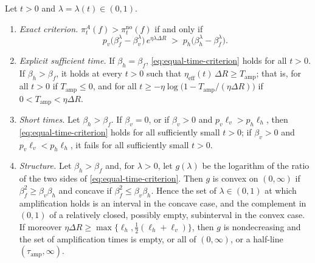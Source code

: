 \begin{proposition}
\label{prop:equal-time}
Let $t>0$ and $\lambda=\lambda(t)\in(0,1)$.
\begin{enumerate}
\item[\textup{(i)}] \emph{Exact criterion.}
$\pi^{A}_t(f)>\pi^{\mathrm{no}}_t(f)$ if and only if
\begin{equation}\label{eq:equal-time-criterion}
p_v\bigl(\beta_f^{\lambda}-\beta_v^{\lambda}\bigr)\,e^{\eta\lambda\Delta R}
\;>\;p_h\bigl(\beta_h^{\lambda}-\beta_f^{\lambda}\bigr).
\end{equation}
\item[\textup{(ii)}] \emph{Explicit sufficient time.} If $\beta_h=\beta_f$,
\eqref{eq:equal-time-criterion} holds for all $t>0$. If $\beta_h>\beta_f$,
it holds at every $t>0$ such that
$\eta_{\mathrm{eff}}(t)\,\Delta R\ge T_{\mathrm{amp}}$; that is, for all
$t>0$ if $T_{\mathrm{amp}}\le0$, and for all
$t\ge-\eta\log\bigl(1-T_{\mathrm{amp}}/(\eta\Delta R)\bigr)$ if
$0<T_{\mathrm{amp}}<\eta\Delta R$.
\item[\textup{(iii)}] \emph{Short times.} Let $\beta_h>\beta_f$. If
$\beta_v=0$, or if $\beta_v>0$ and $p_v\ell_v>p_h\ell_h$, then
\eqref{eq:equal-time-criterion} holds for all sufficiently small $t>0$; if
$\beta_v>0$ and $p_v\ell_v<p_h\ell_h$, it fails for all sufficiently small
$t>0$.
\item[\textup{(iv)}] \emph{Structure.} Let $\beta_h>\beta_f$ and, for
$\lambda>0$, let $g(\lambda)$ be the logarithm of the ratio of the two sides
of \eqref{eq:equal-time-criterion}. Then $g$ is convex on $(0,\infty)$ if
$\beta_f^2\ge\beta_v\beta_h$ and concave if
$\beta_f^2\le\beta_v\beta_h$. Hence the set of $\lambda\in(0,1)$ at which
amplification holds is an interval in the concave case, and the complement
in $(0,1)$ of a relatively closed, possibly empty, subinterval in the convex case. If moreover
$\eta\Delta R\ge\max\{\ell_h,\tfrac12(\ell_h+\ell_v)\}$, then $g$ is
nondecreasing and the set of amplification times is empty, or all of
$(0,\infty)$, or a half-line $(\tau_{\mathrm{amp}},\infty)$.
\end{enumerate}
\end{proposition}

